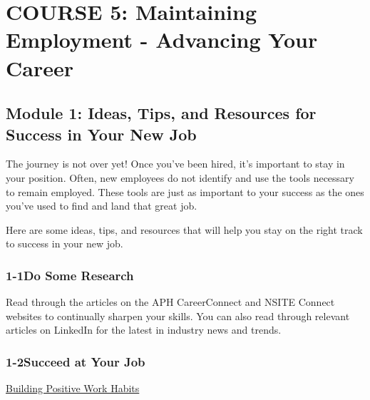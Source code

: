\hypertarget{course5}{}\chapter*{COURSE 5: Maintaining Employment - Advancing Your Career}\label{course5}
\noindent\makebox[\linewidth]{\rule{\linewidth}{0.4pt}}
\localtableofcontents
\noindent\makebox[\textwidth]{\rule{\linewidth}{0.4pt}}
\newpage
\pagebreak \section*{Module 1:	Ideas, Tips, and Resources for Success in Your New Job}
\noindent\makebox[\textwidth]{\rule{\linewidth}{0.4pt}}
\localtableofcontents
\noindent\makebox[\textwidth]{\rule{\linewidth}{0.4pt}}
\leftskip=0.5cm

The journey is not over yet! Once you've been hired, it's important to stay in your position. Often, new employees do not identify and use the tools necessary to remain employed. These tools are just as important to your success as the ones you've used to find and land that great job.

Here are some ideas, tips, and resources that will help you stay on the right track to success in your new job.
\pagebreak \subsection*{1-1\quad Do Some Research}
Read through the articles on the APH CareerConnect and NSITE Connect websites to continually sharpen your skills. You can also read through relevant articles on LinkedIn for the latest in industry news and trends.

\pagebreak \subsection*{1-2\quad Succeed at Your Job}

\href{https://aphcareerconnect.org/succeed-at-work/succeeding-at-your-job/solving-problems-at-work/}{Building Positive Work Habits}

